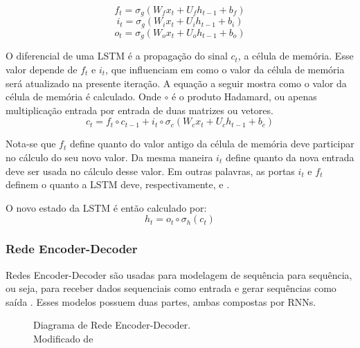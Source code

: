 \[f_t = \sigma_g(W_fx_t + U_fh_{t-1} + b_f)\]
\[i_t = \sigma_g(W_ix_t + U_ih_{t-1} + b_i)\]
\[o_t = \sigma_g(W_ox_t + U_oh_{t-1} + b_o)\]

O diferencial de uma LSTM é a propagação do sinal $c_t$, a célula de memória.
Esse valor depende de $f_t$ e $i_t$, que influenciam em como o valor da
célula de memória será atualizado na presente iteração. A equação a seguir
mostra como o valor da célula de memória é calculado. Onde $\circ$ é o produto Hadamard, ou apenas multiplicação entrada por entrada de
duas matrizes ou vetores. \\

\[c_t = f_t \circ c_{t-1} + i_t \circ \sigma_c(W_cx_t + U_ch_{t-1} + b_c)\]

Nota-se que $f_t$
define quanto do valor antigo da célula de memória deve participar no cálculo do
seu novo valor. 
Da mesma maneira $i_t$ define quanto da nova entrada deve ser usada no cálculo desse valor.
Em outras palavras, as portas $i_t$ e $f_t$ definem o quanto a LSTM deve,
respectivamente,  e .


O novo estado da LSTM é então calculado por: \\
\[h_t = o_t \circ \sigma_h(c_t)\]




\subsubsection{Rede Encoder-Decoder}
\label{sec:encdec}
Redes Encoder-Decoder são usadas para modelagem de sequência para
sequência, ou seja, para receber dados sequenciais como entrada e gerar
sequências como saída \citep{dlbook}. Esses modelos possuem duas partes, ambas compostas por
RNNs. \\

\begin{figure}[H]
\centering

\caption{ Diagrama de Rede Encoder-Decoder.\\ Modificado de \citep{encdec}}

\end{figure}
  
